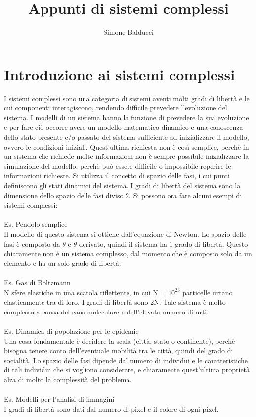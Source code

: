 \documentclass[12pt]{article}
\title{Appunti di sistemi complessi}
\author{Simone Balducci}
\date{}
\begin{document}
\maketitle

\section{Introduzione ai sistemi complessi}
I sistemi complessi sono una categoria di sistemi aventi molti gradi di libertà e le cui componenti interagiscono, rendendo difficile prevedere l'evoluzione del sistema. I modelli di un sistema hanno la funzione di prevedere la sua evoluzione e per fare ciò occorre avere un modello matematico dinamico e una conoscenza dello stato presente e/o passato del sistema sufficiente ad inizializzare il modello, ovvero le condizioni iniziali. Quest'ultima richiesta non è così semplice, perchè in un sistema che richiede molte informazioni non è sempre possibile inizializzare la simulazione del modello, perchè può essere difficile o impossibile reperire le informazioni richieste. 
Si utilizza il concetto di spazio delle fasi, i cui punti definiscono gli stati dinamici del sistema. I gradi di libertà del sistema sono la dimensione dello spazio delle fasi diviso 2.
Si possono ora fare alcuni esempi di sistemi complessi: \\ \\
Es. Pendolo semplice \\
Il modello di questo sistema si ottiene dall'equazione di Newton. Lo spazio delle fasi è composto da $\theta$ e $\dot{\theta}$ derivato, quindi il sistema ha 1 grado di libertà. Questo chiaramente non è un sistema complesso, dal momento che è composto solo da un elemento e ha un solo grado di libertà. \\ \\
Es. Gas di Boltzmann \\
N sfere elastiche in una scatola riflettente, in cui N = $10^{23}$ particelle urtano elasticamente tra di loro. I gradi di libertà sono 2N. Tale sistema è molto complesso a causa del caos molecolare e dell'elevato numero di urti. \\ \\
Es. Dinamica di popolazione per le epidemie \\
Una cosa fondamentale è decidere la scala (città, stato o continente), perchè bisogna tenere conto dell'eventuale mobilità tra le città, quindi del grado di socialità. Lo spazio delle fasi  dipende dal numero di individui e le caratteristiche di tali individui che si vogliono considerare, e chiaramente quest'ultima proprietà alza di molto la complessità del problema. \\ \\
Es. Modelli per l'analisi di immagini \\
I gradi di libertà sono dati dal numero di pixel e il colore di ogni pixel. \\ \\
\end{document}
